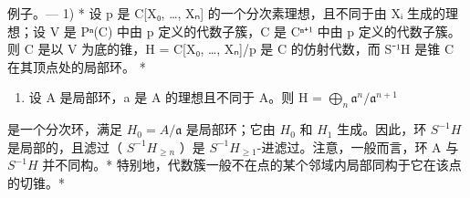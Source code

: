 例子。--- 1) * 设 p 是 C{[}X₀, \ldots, Xₙ{]} 的一个分次素理想，且不同于由 Xᵢ 生成的理想；设 V 是 Pⁿ(C) 中由 p 定义的代数子簇，C 是 Cⁿ⁺¹ 中由 p 定义的代数子簇。则 C 是以 V 为底的锥，H = C{[}X₀, \ldots, Xₙ{]}/p 是 C 的仿射代数，而 S⁻¹H 是锥 C 在其顶点处的局部环。 *

\begin{enumerate}
\def\labelenumi{\arabic{enumi})}
\setcounter{enumi}{1}
\tightlist
\item
  设 A 是局部环，a 是 A 的理想且不同于 A。则 H = \(\bigoplus_{n} \mathfrak{a}^{n}/\mathfrak{a}^{n+1}\)
\end{enumerate}

是一个分次环，满足 \(H_{0} = A/\mathfrak{a}\) 是局部环；它由 \(H_{0}\) 和 \(H_{1}\) 生成。因此，环 \(S^{-1}H\) 是局部的，且滤过（ \(S^{-1}H_{\geq n}\) ）是 \(S^{-1}H_{\geq 1}\)-进滤过。注意，一般而言，环 A 与 \(S^{-1}H\) 并不同构。* 特别地，代数簇一般不在点的某个邻域内局部同构于它在该点的切锥。*

